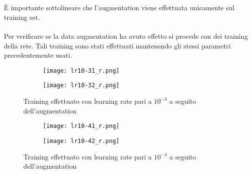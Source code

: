 \\\\
È importante sottolineare che l'augmentation viene effettuata unicamente sul training set.
\\\\
Per verificare se la data augmentation ha avuto effetto si procede con dei training della rete.
Tali training sono stati effettuati mantenendo gli stessi parametri precedentemente usati.

\begin{figure}[h]
    \centering
    \begin{subfigure}{.75\textwidth}
        \centering
        \texttt{[image: lr10-31\_r.png]}  
    \end{subfigure}
    \begin{subfigure}{.75\textwidth}
        \centering
        \texttt{[image: lr10-32\_r.png]}  
    \end{subfigure}
    \caption{Training effettuato con learning rate pari a $10^{-3}$ a seguito dell'augmentation}
    \label{Training Augmentation}
\end{figure}

\begin{figure}[h]
    \centering
    \begin{subfigure}{.75\textwidth}
        \centering
        \texttt{[image: lr10-41\_r.png]}  
    \end{subfigure}
    \begin{subfigure}{.75\textwidth}
        \centering
        \texttt{[image: lr10-42\_r.png]}  
    \end{subfigure}
    \caption{Training effettuato con learning rate pari a $10^{-4}$ a seguito dell'augmentation}
    \label{Training Augmentation}
\end{figure}